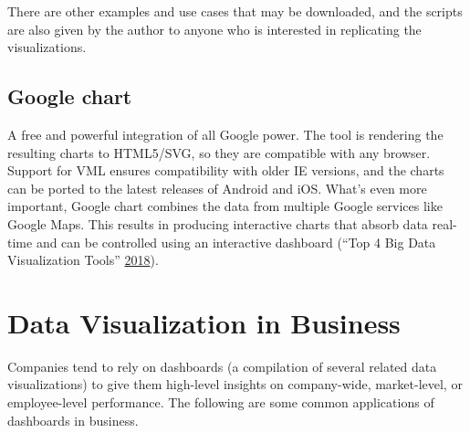 \documentclass[]{book}
\begin{document}
There are other examples and use cases that may be downloaded, and the scripts are also given by the author to anyone who is interested in replicating the visualizations.

\hypertarget{google-chart}{%
\subsection{Google chart}\label{google-chart}}

A free and powerful integration of all Google power. The tool is rendering the resulting charts to HTML5/SVG, so they are compatible with any browser. Support for VML ensures compatibility with older IE versions, and the charts can be ported to the latest releases of Android and iOS. What's even more important, Google chart combines the data from multiple Google services like Google Maps. This results in producing interactive charts that absorb data real-time and can be controlled using an interactive dashboard (``Top 4 Big Data Visualization Tools'' \protect\hyperlink{ref-top4_viz_tools}{2018}).

\hypertarget{data-visualization-in-business}{%
\section{Data Visualization in Business}\label{data-visualization-in-business}}

Companies tend to rely on dashboards (a compilation of several related data visualizations) to give them high-level insights on company-wide, market-level, or employee-level performance. The following are some common applications of dashboards in business.
\end{document}
